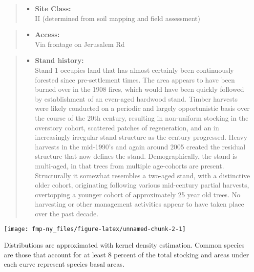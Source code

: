 \documentclass[]{tufte-handout}
\providecommand{\tightlist}{%
  \setlength{\itemsep}{0pt}\setlength{\parskip}{0pt}}
\begin{document}
\begin{quote}
\begin{itemize}
\tightlist
\item
  \textbf{Site Class:}\\
  \vspace{2pt} II (determined from soil mapping and field assessment)
\end{itemize}
\end{quote}

\begin{quote}
\begin{itemize}
\tightlist
\item
  \textbf{Access:}\\
  \vspace{2pt} Via frontage on Jerusalem Rd
\end{itemize}
\end{quote}

\begin{quote}
\begin{itemize}
\tightlist
\item
  \textbf{Stand history:}\\
  \vspace{2pt} Stand 1 occupies land that has almost certainly been
  continuously forested since pre-settlement times. The area appears to
  have been burned over in the 1908 fires, which would have been quickly
  followed by establishment of an even-aged hardwood stand. Timber
  harvests were likely conducted on a periodic and largely opportunistic
  basis over the course of the 20th century, resulting in non-uniform
  stocking in the overstory cohort, scattered patches of regeneration,
  and an in increasingly irregular stand structure as the century
  progressed. Heavy harvests in the mid-1990's and again around 2005
  created the residual structure that now defines the stand.
  Demographically, the stand is multi-aged, in that trees from multiple
  age-cohorts are present. Structurally it somewhat resembles a two-aged
  stand, with a distinctive older cohort, originating following various
  mid-century partial harvests, overtopping a younger cohort of
  approximately 25 year old trees. No harvesting or other management
  activities appear to have taken place over the past decade.
\end{itemize}
\end{quote}

\begin{marginfigure}
\texttt{[image: fmp-ny\_files/figure-latex/unnamed-chunk-2-1]} \caption[Distributions are approximated with kernel density estimation]{Distributions are approximated with kernel density estimation. Common species are those that account for at least 8 percent of the total stocking and areas under each curve represent species basal areas.}\label{fig:unnamed-chunk-2}
\end{marginfigure}
\end{document}
